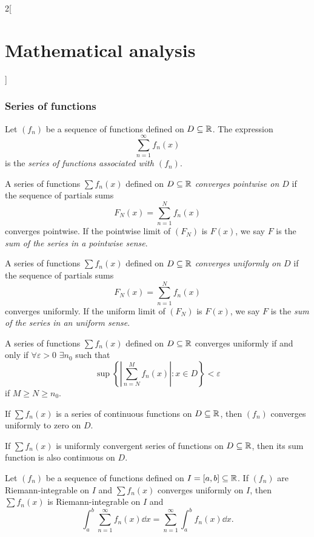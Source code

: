 \documentclass[../../../main.tex]{subfiles}
\begin{document}
\begin{multicols}{2}[\section{Mathematical analysis}]
  \subsubsection{Series of functions}
  \begin{definition}
    Let $(f_n)$ be a sequence of functions defined on $D\subseteq\mathbb{R} $. The expression $$\sum_{n=1}^\infty f_n(x)$$ is the \textit{series of functions associated with $(f_n)$}.
  \end{definition}
  \begin{definition}
    A series of functions $\sum f_n(x)$ defined on $D\subseteq\mathbb{R} $ \textit{converges pointwise on $D$} if the sequence of partials sums $$F_N(x)=\sum_{n=1}^Nf_n(x)$$ converges pointwise. If the pointwise limit of $(F_N)$ is $F(x)$, we say $F$ is the \textit{sum of the series in a pointwise sense}.
  \end{definition}
  \begin{definition}
    A series of functions $\sum f_n(x)$ defined on $D\subseteq\mathbb{R} $ \textit{converges uniformly on $D$} if the sequence of partials sums $$F_N(x)=\sum_{n=1}^Nf_n(x)$$ converges uniformly. If the uniform limit of $(F_N)$ is $F(x)$, we say $F$ is the \textit{sum of the series in an uniform sense}.
  \end{definition}
  \begin{theorem}
    A series of functions $\sum f_n(x)$ defined on $D\subseteq\mathbb{R} $ converges uniformly if and only if $\forall\varepsilon>0$ $\exists n_0$ such that $$\sup\left\{\left|\sum_{n=N}^Mf_n(x)\right|:x\in D\right\}< \varepsilon$$ if $M\geq N\geq n_0$.
  \end{theorem}
  \begin{corollary}
    If $\sum f_n(x)$ is a series of continuous functions on $D\subseteq\mathbb{R} $, then $(f_n)$ converges uniformly to zero on $D$.
  \end{corollary}
  \begin{theorem}
    If $\sum f_n(x)$ is uniformly convergent series of functions on $D\subseteq\mathbb{R} $, then its sum function is also continuous on $D$.
  \end{theorem}
  \begin{theorem}
    Let $(f_n)$ be a sequence of functions defined on $I=[a,b]\subseteq\mathbb{R} $. If $(f_n)$ are Riemann-integrable on $I$ and $\sum f_n(x)$ converges uniformly on $I$, then $\sum f_n(x)$ is Riemann-integrable on $I$ and $$\int_a^b\sum_{n=1}^\infty f_n(x) \dd x=\sum_{n=1}^\infty \int_a^bf_n(x) \dd x.$$
  \end{theorem}

\end{multicols}
\end{document}
